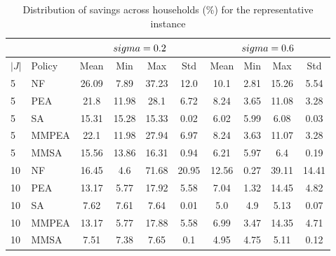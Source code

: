 \begin{table}[h]
\centering
\caption{Distribution of savings across households (\%) for the representative instance}
\label{tab:coverage_SA_repr}
\begin{tabular}{llcccc|cccc}
\hline
 &  & \multicolumn{4}{c|}{$\\sigma = 0.2$} & \multicolumn{4}{c}{$\\sigma = 0.6$} \\
\hline
$|J|$ & Policy & Mean & Min & Max & Std & Mean & Min & Max & Std \\
\hline
5 & NF & 26.09 & 7.89 & 37.23 & 12.0 & 10.1 & 2.81 & 15.26 & 5.54 \\
5 & PEA & 21.8 & 11.98 & 28.1 & 6.72 & 8.24 & 3.65 & 11.08 & 3.28 \\
5 & SA & 15.31 & 15.28 & 15.33 & 0.02 & 6.02 & 5.99 & 6.08 & 0.03 \\
5 & MMPEA & 22.1 & 11.98 & 27.94 & 6.97 & 8.24 & 3.63 & 11.07 & 3.28 \\
5 & MMSA & 15.56 & 13.86 & 16.31 & 0.94 & 6.21 & 5.97 & 6.4 & 0.19 \\
\hline
10 & NF & 16.45 & 4.6 & 71.68 & 20.95 & 12.56 & 0.27 & 39.11 & 14.41 \\
10 & PEA & 13.17 & 5.77 & 17.92 & 5.58 & 7.04 & 1.32 & 14.45 & 4.82 \\
10 & SA & 7.62 & 7.61 & 7.64 & 0.01 & 5.0 & 4.9 & 5.13 & 0.07 \\
10 & MMPEA & 13.17 & 5.77 & 17.88 & 5.58 & 6.99 & 3.47 & 14.35 & 4.71 \\
10 & MMSA & 7.51 & 7.38 & 7.65 & 0.1 & 4.95 & 4.75 & 5.11 & 0.12 \\
\hline
\end{tabular}
\end{table}
